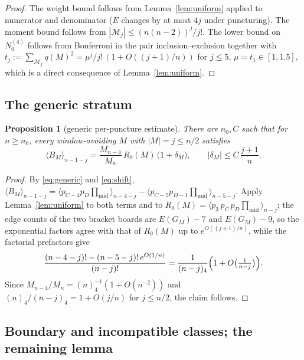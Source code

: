 \documentclass[11pt]{article}
\newtheorem{proposition}[theorem]{Proposition}
\theoremstyle{definition}
\begin{document}
\begin{proof}
The weight bound follows from Lemma~\ref{lem:uniform} applied to numerator
and denominator ($E$ changes by at most $4j$ under puncturing).  The
moment bound follows from $|\mathcal M_j|\le (n(n-2))^j/j!$.  The lower
bound on $N^{(4)}_0$ follows from Bonferroni in the pair
inclusion--exclusion together with
$t_j:=\sum_{\mathcal M_j}q(M)^2=\mu^j/j!\,(1+O((j{+}1)/n))$ for
$j\le5$, $\mu=t_1\in[1,1.5]$, which is a direct consequence of
Lemma~\ref{lem:uniform}.
\end{proof}

\subsection{The generic stratum}

\begin{proposition}[generic per-puncture estimate]\label{prop:generic}
There are $n_0,C$ such that for $n\ge n_0$, every window-avoiding $M$
with $|M|=j\le n/2$ satisfies
\[
\langle B_M\rangle_{n-1-j}
=\frac{M_{n-4}}{M_n}\,R_0(M)\,\bigl(1+\delta_M\bigr),
\qquad|\delta_M|\le C\,\frac{j+1}{n}.
\]
\end{proposition}

\begin{proof}
By \eqref{eq:generic} and \eqref{eq:shift},
$\langle B_M\rangle_{n-1-j}
=\langle p_{C-4}p_D\prod_{\mathrm{mid}}\rangle_{n-4-j}
-\langle p_{C-5}p_{D-1}\prod_{\mathrm{mid}}\rangle_{n-5-j}$.
Apply Lemma~\ref{lem:uniform} to both terms and to
$R_0(M)=\langle p_3\,p_C\,p_D\prod_{\mathrm{mid}}\rangle_{n-j}$; the
edge counts of the two bracket boards are $E(G_M)-7$ and $E(G_M)-9$, so
the exponential factors agree with that of $R_0(M)$ up to
$e^{O((j+1)/n)}$, while the factorial prefactors give
\[
\frac{(n-4-j)!-(n-5-j)!\,e^{O(1/n)}}{(n-j)!}
=\frac{1}{(n-j)_4}\Bigl(1+O\bigl(\tfrac1{n-j}\bigr)\Bigr).
\]  Since $M_{n-4}/M_n=(n)_4^{-1}(1+O(n^{-2}))$ and
$(n)_4/(n-j)_4=1+O(j/n)$ for $j\le n/2$, the claim follows.
\end{proof}

\subsection{Boundary and incompatible classes; the remaining lemma}
\label{sec:boundary}
\end{document}
